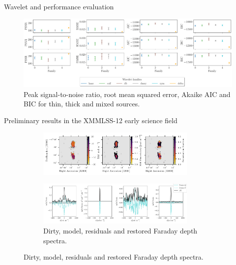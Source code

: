 \documentclass[xetex,aspectratio=169]{beamer}
\begin{document}
\begin{frame}{Wavelet and performance evaluation}
	\begin{figure}
		\centering
		\includegraphics[width=\textwidth]{figures/wavelets/families_wavelets_meerkat.pdf}
		\caption*{Peak signal-to-noise ratio, root mean squared error, Akaike AIC and BIC for thin, thick and mixed sources.}

	\end{figure}
\end{frame}


\begin{frame}{Preliminary results in the XMMLSS-12 early science field}

	\begin{figure}
		\centering
		\begin{subfigure}{\textwidth}
			\centering
			\includegraphics[width=0.85\textwidth]{figures/plot_rm.pdf}
		\end{subfigure}
		\begin{subfigure}{\textwidth}
			\centering
			\includegraphics[width=0.85\textwidth]{figures/los.pdf}
			\caption{Dirty, model, residuals and restored Faraday depth spectra.}
		\end{subfigure}

	\end{figure}
\end{frame}
\end{document}

